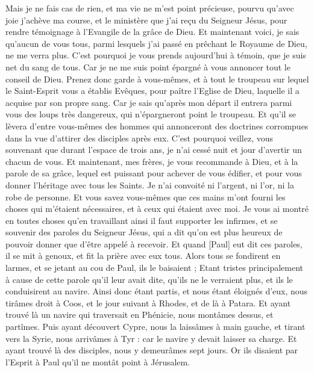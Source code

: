 \begin{multicols}{2}
Mais je ne fais cas de rien, et ma vie ne m'est point précieuse, pourvu qu'avec joie j'achève ma course, et le ministère que j'ai reçu du Seigneur Jésus, pour rendre témoignage à l'Evangile de la grâce de Dieu.
Et maintenant voici, je sais qu'aucun de vous tous, parmi lesquels j'ai passé en prêchant le Royaume de Dieu, ne me verra plus.
C'est pourquoi je vous prends aujourd'hui à témoin, que je suis net du sang de tous.
Car je ne me suis point épargné à vous annoncer tout le conseil de Dieu.
Prenez donc garde à vous-mêmes, et à tout le troupeau sur lequel le Saint-Esprit vous a établis Evêques, pour paître l'Eglise de Dieu, laquelle il a acquise par son propre sang.
Car je sais qu'après mon départ il entrera parmi vous des loups très dangereux, qui n'épargneront point le troupeau.
Et qu'il se lèvera d'entre vous-mêmes des hommes qui annonceront des doctrines corrompues dans la vue d'attirer des disciples après eux.
C'est pourquoi veillez, vous souvenant que durant l'espace de trois ans, je n'ai cessé nuit et jour d'avertir un chacun de vous.
Et maintenant, mes frères, je vous recommande à Dieu, et à la parole de sa grâce, lequel est puissant pour achever de vous édifier, et pour vous donner l'héritage avec tous les Saints.
Je n'ai convoité ni l'argent, ni l'or, ni la robe de personne.
Et vous savez vous-mêmes que ces mains m'ont fourni les choses qui m'étaient nécessaires, et à ceux qui étaient avec moi.
Je vous ai montré en toutes choses qu'en travaillant ainsi il faut supporter les infirmes, et se souvenir des paroles du Seigneur Jésus, qui a dit qu'on est plus heureux de pouvoir donner que d'être appelé à recevoir.
Et quand [Paul] eut dit ces paroles, il se mit à genoux, et fit la prière avec eux tous.
Alors tous se fondirent en larmes, et se jetant au cou de Paul, ils le baisaient ;
Etant tristes principalement à cause de cette parole qu'il leur avait dite, qu'ils ne le verraient plus, et ils le conduisirent au navire.
\VerseOne{}Ainsi donc étant partis, et nous étant éloignés d'eux, nous tirâmes droit à Coos, et le jour suivant à Rhodes, et de là à Patara.
Et ayant trouvé là un navire qui traversait en Phénicie, nous montâmes dessus, et partîmes.
Puis ayant découvert Cypre, nous la laissâmes à main gauche, et tirant vers la Syrie, nous arrivâmes à Tyr : car le navire y devait laisser sa charge.
Et ayant trouvé là des disciples, nous y demeurâmes sept jours. Or ils disaient par l'Esprit à Paul qu'il ne montât point à Jérusalem.

\end{multicols}
